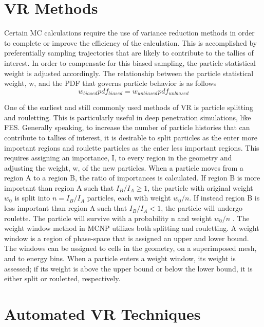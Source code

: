 \section{VR Methods}\label{sec:vr_methods}

Certain MC calculations require the use of variance reduction methods in order
to complete or improve the efficiency of the calculation. 
This is accomplished
by preferentially sampling trajectories that are likely to contribute to the tallies of
interest.
In order to compensate for this biased sampling, the particle statistical weight
is adjusted accordingly.
The relationship between the particle statistical weight, w, and the PDF that
governs particle behavior is as follows
\begin{equation} \label{eq:2.1}
		w_{biased} pdf_{biased} = w_{unbiased} pdf_{unbiased}
\end{equation}

One of the earliest and still commonly used methods of VR is particle splitting
and rouletting.  This is particularly useful in deep penetration simulations,
like FES.  Generally speaking, to increase the number of particle
histories that can contribute to tallies of interest, it is desirable to split
particles as the enter more important regions and roulette particles as the
enter less important regions. 
This requires assigning an importance, I, to every
region in the geometry and adjusting the weight, w, of the new particles. 
When a particle moves from a region A to a region B,
the ratio of importances is calculated.  If region B is more important than
region A such that 
$I_{B}/I_{A} \geqslant 1$, 
the particle with original weight $w_{0}$ is split into 
$n = I_{B}/I_{A}$
particles, each with weight $w_{0}/n$.  If instead region B is less important
than
region A such that
$I_{B}/I_{A} < 1$, 
the particle will undergo roulette. 
The particle will survive with a probability n and weight $w_{0}/n$
\cite{Carter_Cashwell_1975}.
The weight window method in MCNP utilizes both splitting and
rouletting.  A weight window is a region of phase-space that is assigned an upper and
lower bound.  The windows can be assigned to cells in the geometry, on a
superimposed mesh, and to energy bins.  When a particle enters a weight window, its weight is assessed; if
its weight is above the upper bound or below the lower bound, it is either split
or rouletted, respectively.


\section{Automated VR Techniques}\label{sec:auto_vr}

